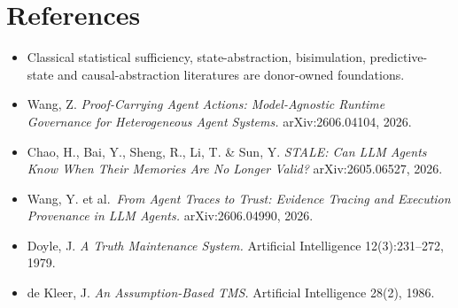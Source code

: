 \section{References}\label{references}

\begin{itemize}
\tightlist
\item
  Classical statistical sufficiency, state-abstraction, bisimulation,
  predictive-state and causal-abstraction literatures are donor-owned
  foundations.
\item
  Wang, Z. \emph{Proof-Carrying Agent Actions: Model-Agnostic Runtime
  Governance for Heterogeneous Agent Systems.} arXiv:2606.04104, 2026.
\item
  Chao, H., Bai, Y., Sheng, R., Li, T. \& Sun, Y. \emph{STALE: Can LLM
  Agents Know When Their Memories Are No Longer Valid?}
  arXiv:2605.06527, 2026.
\item
  Wang, Y. et al.~\emph{From Agent Traces to Trust: Evidence Tracing and
  Execution Provenance in LLM Agents.} arXiv:2606.04990, 2026.
\item
  Doyle, J. \emph{A Truth Maintenance System.} Artificial Intelligence
  12(3):231--272, 1979.
\item
  de Kleer, J. \emph{An Assumption-Based TMS.} Artificial Intelligence
  28(2), 1986.
\end{itemize}
